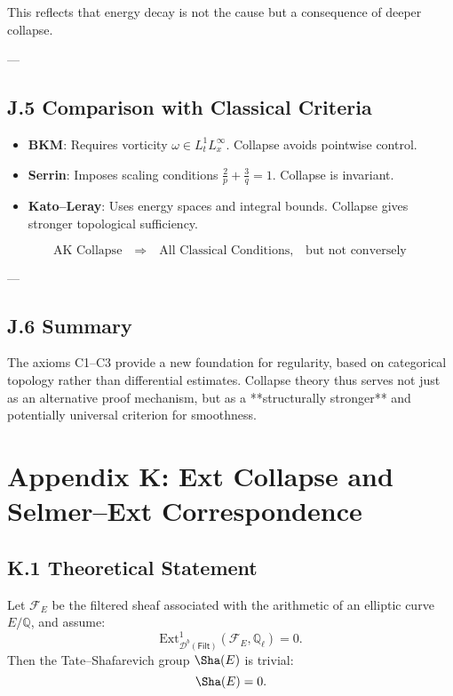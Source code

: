 This reflects that energy decay is not the cause but a consequence of deeper collapse.

---

\subsection*{J.5 Comparison with Classical Criteria}

\begin{itemize}
  \item \textbf{BKM}: Requires vorticity \( \omega \in L^1_t L^\infty_x \). Collapse avoids pointwise control.
  \item \textbf{Serrin}: Imposes scaling conditions \( \frac{2}{p} + \frac{3}{q} = 1 \). Collapse is invariant.
  \item \textbf{Kato–Leray}: Uses energy spaces and integral bounds. Collapse gives stronger topological sufficiency.
\end{itemize}

\[
\boxed{
\text{AK Collapse} \quad \textbf{⇒} \quad \text{All Classical Conditions},
\quad \text{but not conversely}
}
\]

---

\subsection*{J.6 Summary}

The axioms C1–C3 provide a new foundation for regularity, based on  
categorical topology rather than differential estimates.  
Collapse theory thus serves not just as an alternative proof mechanism,  
but as a **structurally stronger** and potentially universal criterion for smoothness.



\section*{Appendix K: Ext Collapse and Selmer--Ext Correspondence}

\subsection*{K.1 Theoretical Statement}

\begin{theorem}
Let \( \mathcal{F}_E \) be the filtered sheaf associated with the arithmetic of an elliptic curve \( E/\mathbb{Q} \), and assume:
\[
\mathrm{Ext}^1_{\mathcal{D}^b(\mathsf{Filt})}(\mathcal{F}_E, \mathbb{Q}_\ell) = 0.
\]
Then the Tate–Shafarevich group \( \Sha(E) \) is trivial:
\[
\Sha(E) = 0.
\]
\end{theorem}

